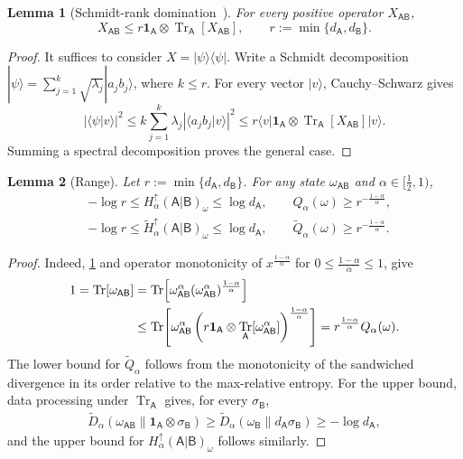 \documentclass[11pt,reqno]{amsart}
\newtheorem{lemma}[lemma]{Lemma}
\theoremstyle{definition}
\DeclareMathOperator{\Tr}{Tr}
\newcommand{\I}{\mathbf 1}
\newcommand{\A}{\mathsf{A}}
\newcommand{\B}{\mathsf{B}}
\newcommand{\abs}[1]{\left\lvert#1\right\rvert}
\newcommand{\sand}{\widetilde}
\begin{document}
\begin{lemma}[Schmidt-rank domination~{\cite{terhal2000schmidt}}]\label{lem:Schmidt-domination}
For every positive operator $X_{\A\B}$,
\begin{equation}\label{eq:Schmidt-domination}
 X_{\A\B}
 \leq
 r\I_{\A}\otimes\Tr_{\A}[X_{\A\B}],
 \qquad
 r:=\min\{d_{\A},d_{\B}\}.
\end{equation}
\end{lemma}

\begin{proof}
It suffices to consider $X=|\psi\rangle\!\langle\psi|$.  Write a Schmidt
decomposition
$|\psi\rangle=\sum_{j=1}^{k}\sqrt{\lambda_j}|a_jb_j\rangle$, where
$k\leq r$.  For every vector $|v\rangle$, Cauchy--Schwarz gives
\[
 \abs{\langle\psi|v\rangle}^2
 \leq k\sum_{j=1}^{k}\lambda_j
       \abs{\langle a_jb_j|v\rangle}^2
 \leq r\langle v|\I_{\A}\otimes\Tr_{\A}[X_{\A\B}]|v\rangle.
\]
Summing a spectral decomposition proves the general case.
\end{proof}

\begin{lemma}[Range] \label{lem:lower_bound}
    Let $r:=\min\{d_{\A},d_{\B}\}$.
	For any state $\omega_{\A\B}$ and $\alpha \in [\frac12,1)$,
	\begin{align}
		 &-\log r
		\leq
		H_{\alpha}^{\uparrow}(\A|\B)_{\omega}
		\leq
		\log d_{\A},
		\qquad
		Q_\alpha(\omega)\geq r^{-\frac{1-\alpha}{\alpha}},
		 \label{eq:Q-lower-range}
        \\
        &-\log r
		\leq
		\sand H_{\alpha}^{\uparrow}(\A|\B)_{\omega}
		\leq
		\log d_{\A},
		\qquad
		\sand Q_\alpha(\omega)\geq r^{-\frac{1-\alpha}{\alpha}}.
	\end{align}
\end{lemma}
\begin{proof}
Indeed, \cref{lem:Schmidt-domination} and operator monotonicity of
$x^{\frac{1-\alpha}{\alpha}}$ for $0\leq \frac{1-\alpha}{\alpha}\leq1$, give
\begin{align}
	1=\Tr[\omega_{\A\B}]
	&=\Tr\!\left[
	\omega_{\A\B}^\alpha
	(\omega_{\A\B}^\alpha)^{\frac{1-\alpha}{\alpha}}
	\right]\notag\\
	&\leq
	\Tr\!\left[
	\omega_{\A\B}^\alpha
	\left(
	r\I_{\A}\otimes\Tr_{\A}[\omega_{\A\B}^\alpha]
	\right)^{\frac{1-\alpha}{\alpha}}
	\right]
	=r^{\frac{1-\alpha}{\alpha}}Q_\alpha(\omega).
	\label{eq:Q-lower-range-proof}
\end{align}
The lower bound for $\sand Q_{\alpha}$ follows from the monotonicity of the sandwiched
divergence in its order relative to the max-relative entropy.
For the upper
bound, data processing under $\Tr_{\A}$ gives, for every $\sigma_{\B}$,
\begin{align}
 \sand D_{\alpha}
 (\omega_{\A\B}\|\I_{\A}\otimes\sigma_{\B})
 \geq
 \sand D_{\alpha}(\omega_{\B}\|d_{\A}\sigma_{\B})
 \geq-\log d_{\A},
\end{align}
and the upper bound for $H_{\alpha}^{\uparrow}(\A|\B)_{\omega}$ follows similarly.
\end{proof}
\end{document}
